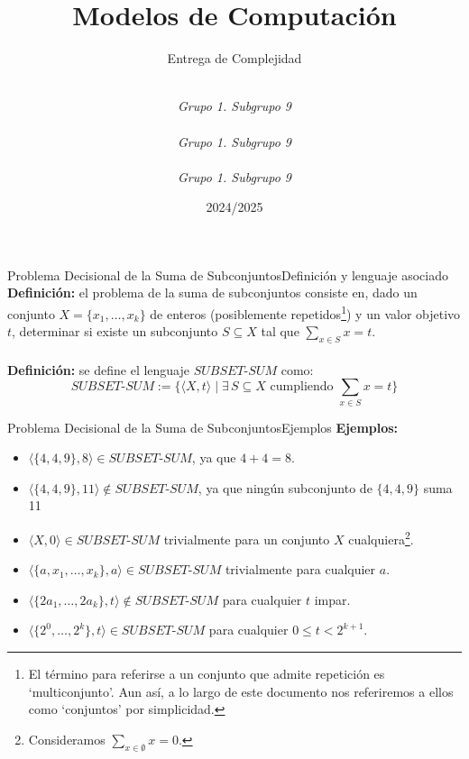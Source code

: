 \documentclass[10pt, envcountsect, presentation, aspectratio=169]{beamer}
\title[Nombre]{Modelos de Computación}
\subtitle{Entrega de Complejidad} %
\author[Carrillo G., Gallego J., Ibarrola Y.] %
{
	\sc{Ginés Carrillo Ibáñez}\\  %
	\textit{Grupo 1. Subgrupo 9}\\
	\sc{Juan Diego Gallego Nicolás}\\ %
	\textit{Grupo 1. Subgrupo 9}\\ 
	\sc{Yago Ibarrola Lapeña}\\ %
	\textit{Grupo 1. Subgrupo 9}\\ 
}
\institute[GII]%
{
	\textit{Universidad de Murcia}
}
\date{2024/2025} %
\newcommand{\ssum}{\ensuremath{SUBSET\text{-}SUM}}
\begin{document}
	



\begin{frame}[plain]
	\titlepage
\end{frame}

\begin{frame}{Problema Decisional de la Suma de Subconjuntos}{Definición y lenguaje asociado}
    \textbf{Definición:} el problema de la suma de subconjuntos consiste en, dado un conjunto $X=\{x_1, \dots, x_k\}$ de enteros (posiblemente repetidos\footnote{El término para referirse a un conjunto que admite repetición es `multiconjunto'. Aun así, a lo largo de este documento nos referiremos a ellos como `conjuntos' por simplicidad.}) y un valor objetivo $t$, determinar si existe un subconjunto $S \subseteq X$ tal que $\sum _{x\in S}x = t$.\\~\\

    \textbf{Definición:} se define el lenguaje $\ssum$ como:
    $$
    \ssum:=\{\langle X, t \rangle \mid \exists \, S\subseteq X \text{ cumpliendo }\sum _{x\in S}x = t\}
    $$
    
    
\end{frame}
\begin{frame}{Problema Decisional de la Suma de Subconjuntos}{Ejemplos}
    \textbf{Ejemplos:}
    \begin{itemize}
        \item $\langle \{4, 4, 9\}, 8\rangle \in \ssum$, ya que  $4+4=8$.
        \item $\langle \{4, 4, 9\}, 11\rangle \notin \ssum$, ya que ningún subconjunto de $\{4, 4, 9\}$ suma 11
        \item $\langle X, 0\rangle \in \ssum$ trivialmente para un conjunto $X$ cualquiera\footnote{Consideramos $\sum_{x\in\emptyset} x = 0$.}.
        \item $\langle \{a, x_1, \dots, x_k\}, a\rangle \in \ssum$ trivialmente para cualquier $a$.
        \item $\langle \{2a_1,\dots,2a_k\}, t\rangle \notin \ssum$ para cualquier $t$ impar.
        \item $\langle \{2^0, \dots, 2^k\}, t\rangle \in \ssum$ para cualquier $0\leq t<2^{k+1}$.
        
    \end{itemize}
\end{frame}
\end{document}
